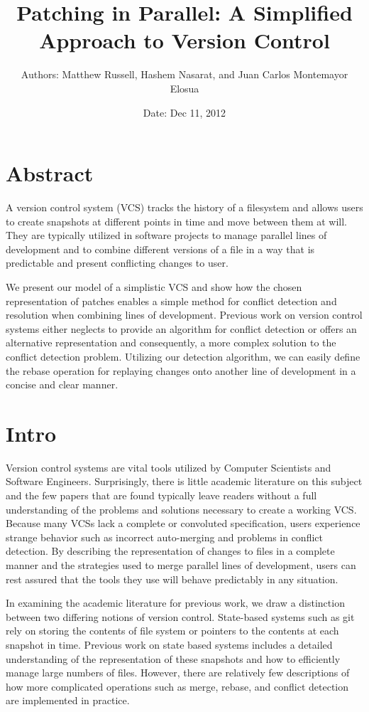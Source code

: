 \documentclass[]{article}
\title{Patching in Parallel: A Simplified Approach to Version Control}
\author{Authors: Matthew Russell, Hashem Nasarat, and Juan Carlos Montemayor
                Elosua}
\date{Date: Dec 11, 2012}
\begin{document}
\maketitle

\section{Abstract}

A version control system (VCS) tracks the history of a filesystem and
allows users to create snapshots at different points in time and move
between them at will. They are typically utilized in software projects
to manage parallel lines of development and to combine different
versions of a file in a way that is predictable and present conflicting
changes to user.

We present our model of a simplistic VCS and show how the chosen
representation of patches enables a simple method for conflict detection
and resolution when combining lines of development. Previous work on
version control systems either neglects to provide an algorithm for
conflict detection or offers an alternative representation and
consequently, a more complex solution to the conflict detection problem.
Utilizing our detection algorithm, we can easily define the rebase
operation for replaying changes onto another line of development in a
concise and clear manner.

\section{Intro}

Version control systems are vital tools utilized by Computer Scientists
and Software Engineers. Surprisingly, there is little academic
literature on this subject and the few papers that are found typically
leave readers without a full understanding of the problems and solutions
necessary to create a working VCS. Because many VCSs lack a complete or
convoluted specification, users experience strange behavior such as
incorrect auto-merging and problems in conflict detection. By describing
the representation of changes to files in a complete manner and the
strategies used to merge parallel lines of development, users can rest
assured that the tools they use will behave predictably in any
situation.

In examining the academic literature for previous work, we draw a
distinction between two differing notions of version control.
State-based systems such as git rely on storing the contents of file
system or pointers to the contents at each snapshot in time. Previous
work on state based systems includes a detailed understanding of the
representation of these snapshots and how to efficiently manage large
numbers of files. However, there are relatively few descriptions of how
more complicated operations such as merge, rebase, and conflict
detection are implemented in practice.
\end{document}
